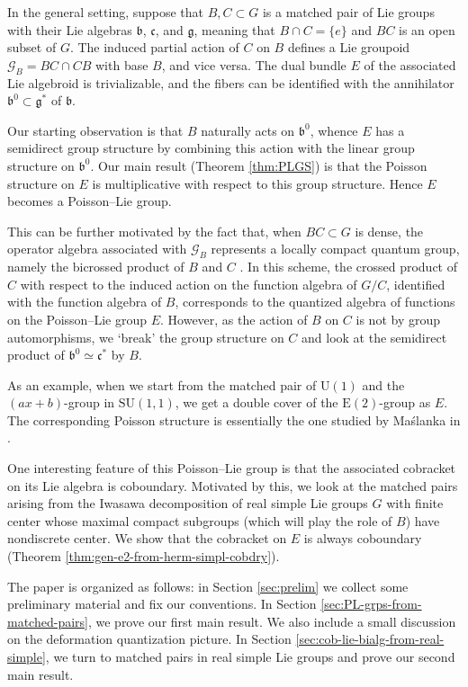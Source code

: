 \documentclass[a4paper,11pt]{amsart}
\newcommand{\s}[1]{\mathcal{#1}}
\newcommand{\fr}[1]{\mathfrak{#1}}
\newcommand{\SU}{\mathrm{SU}}
\newcommand{\rE}{\mathrm{E}}
\newcommand{\rU}{\mathrm{U}}
\theoremstyle{definition}
\theoremstyle{remark}
\begin{document}
In the general setting, suppose that $B, C \subset G$ is a matched pair of Lie groups with their Lie algebras $\fr b$, $\fr c$, and $\fr g$, meaning that $B \cap C = \{ e \}$ and $B C$ is an open subset of $G$.
The induced partial action of $C$ on $B$ defines a Lie groupoid $\s{G}_B = B C \cap C B$ with base $B$, and vice versa.
The dual bundle $E$ of the associated Lie algebroid is trivializable, and the fibers can be identified with the annihilator $\fr b^0 \subset \fr g^*$ of $\fr b$.

Our starting observation is that $B$ naturally acts on $\fr b^0$, whence $E$ has a semidirect group structure by combining this action with the linear group structure on $\fr b^0$.
Our main result (Theorem \ref{thm:PLGS}) is that the Poisson structure on $E$ is multiplicative with respect to this group structure.
Hence $E$ becomes a Poisson--Lie group.

This can be further motivated by the fact that, when $B C \subset G$ is dense, the operator algebra associated with $\s{G}_B$ represents a locally compact quantum group, namely the bicrossed product of $B$ and $C$ \cite{MR1969723}.
In this scheme, the crossed product of $C$ with respect to the induced action on the function algebra of $G / C$, identified with the function algebra of $B$, corresponds to the quantized algebra of functions on the Poisson--Lie group $E$.
However, as the action of $B$ on $C$ is not by group automorphisms, we `break' the group structure on $C$ and look at the semidirect product of $\fr b^0 \simeq \fr c^*$ by $B$.

As an example, when we start from the matched pair of $\rU(1)$ and the $(a x + b)$-group in $\SU(1, 1)$, we get a double cover of the $\rE(2)$-group as $E$.
The corresponding Poisson structure is essentially the one studied by Maślanka in \cite{MR1267935}.

One interesting feature of this Poisson--Lie group is that the associated cobracket on its Lie algebra is coboundary.
Motivated by this, we look at the matched pairs arising from the Iwasawa decomposition of real simple Lie groups $G$ with finite center whose maximal compact subgroups (which will play the role of $B$) have nondiscrete center.
We show that the cobracket on $E$ is always coboundary (Theorem \ref{thm:gen-e2-from-herm-simpl-cobdry}).

The paper is organized as follows:
in Section \ref{sec:prelim} we collect some preliminary material and fix our conventions.
In Section \ref{sec:PL-grps-from-matched-pairs}, we prove our first main result.
We also include a small discussion on the deformation quantization picture.
In Section \ref{sec:cob-lie-bialg-from-real-simple}, we turn to matched pairs in real simple Lie groups and prove our second main result.
\end{document}
